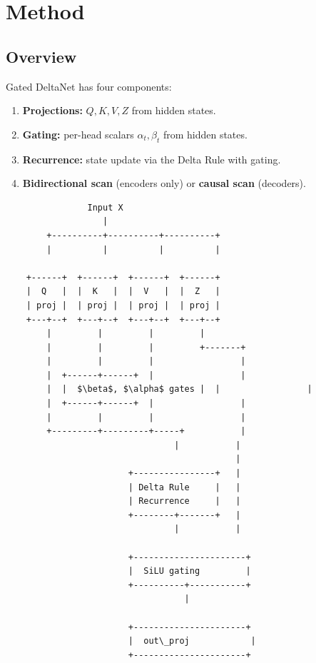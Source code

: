 
\section{Method}

\subsection{Overview}

Gated DeltaNet has four components:

\begin{enumerate}
\item \textbf{Projections:} $Q, K, V, Z$ from hidden states.
\item \textbf{Gating:} per-head scalars $\alpha_t, \beta_t$ from hidden states.
\item \textbf{Recurrence:} state update via the Delta Rule with gating.
\item \textbf{Bidirectional scan} (encoders only) or \textbf{causal scan} (decoders).

\end{enumerate}
\begin{lstlisting}
                Input X
                   |
        +----------+----------+----------+
        |          |          |          |
                                          
    +------+  +------+  +------+  +------+
    |  Q   |  |  K   |  |  V   |  |  Z   |
    | proj |  | proj |  | proj |  | proj |
    +---+--+  +---+--+  +---+--+  +---+--+
        |         |         |         |
        |         |         |         +-------+
        |         |         |                 |
        |  +------+------+  |                 |
        |  |  $\beta$, $\alpha$ gates |  |                 |
        |  +------+------+  |                 |
        |         |         |                 |
        +---------+---------+-----+           |
                                 |           |
                                             |
                        +----------------+   |
                        | Delta Rule     |   |
                        | Recurrence     |   |
                        +--------+-------+   |
                                 |           |
                                              
                        +----------------------+
                        |  SiLU gating         |
                        +----------+-----------+
                                   |
                                    
                        +----------------------+
                        |  out\_proj            |
                        +----------------------+
\end{lstlisting}

